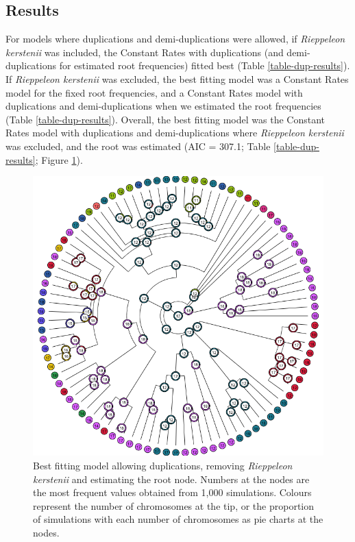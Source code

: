 \documentclass[a4paper, 12pt]{article}
\begin{document}


\subsection{Results}

For models where duplications and demi-duplications were allowed, if \textit{Rieppeleon kerstenii} was included, the Constant Rates with duplications (and demi-duplications for estimated root frequencies) fitted best (Table \ref{table-dup-results}). If \textit{Rieppeleon kerstenii} was excluded, the best fitting model was a Constant Rates model for the fixed root frequencies, and a Constant Rates model with duplications and demi-duplications when we estimated the root frequencies (Table \ref{table-dup-results}). Overall, the best fitting model was the Constant Rates model with duplications and demi-duplications where \textit{Rieppeleon kerstenii} was excluded, and the root was estimated (AIC = 307.1; Table \ref{table-dup-results}; Figure \ref{fig-dup}).



\newpage
\begin{figure}[h]
 \centering
  \includegraphics[width = \linewidth]{figures/figure-chromEvol_best-model-all.png}
  \caption{Best fitting model allowing duplications, removing \textit{Rieppeleon kerstenii} and estimating the root node. Numbers at the nodes are the most frequent values obtained from 1,000 simulations. Colours represent the number of chromosomes at the tip, or the proportion of simulations with each number of chromosomes as pie charts at the nodes.
}
  \label{fig-dup}
\end{figure} 
\end{document}
